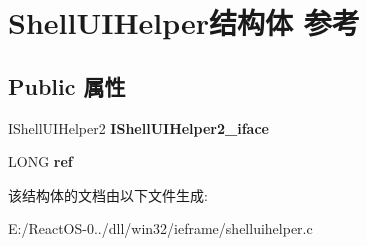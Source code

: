 \hypertarget{struct_shell_u_i_helper}{}\section{Shell\+U\+I\+Helper结构体 参考}
\label{struct_shell_u_i_helper}
\subsection*{Public 属性}
\begin{DoxyCompactItemize}
\item 
\mbox{\label{struct_shell_u_i_helper_aecd3fec15692f2c6f0a794b92eb9d14f}} 
I\+Shell\+U\+I\+Helper2 {\bfseries I\+Shell\+U\+I\+Helper2\+\_\+iface}
\item 
\mbox{\label{struct_shell_u_i_helper_a520ccfdbc09560b81597daa523bb2552}} 
L\+O\+NG {\bfseries ref}
\end{DoxyCompactItemize}


该结构体的文档由以下文件生成\+:\begin{DoxyCompactItemize}
\item 
E\+:/\+React\+O\+S-\/0../dll/win32/ieframe/shelluihelper.\+c\end{DoxyCompactItemize}
